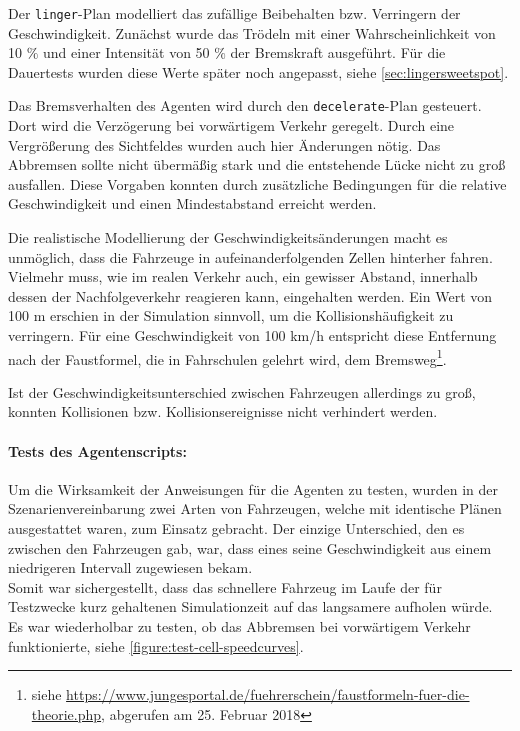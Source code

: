 Der \texttt{linger}-Plan modelliert das zufällige Beibehalten bzw. Verringern der Geschwindigkeit. 
Zunächst wurde das Trödeln mit einer Wahrscheinlichkeit von 10 $\%$ und einer Intensität von 50 $\%$ der Bremskraft ausgeführt.
Für die Dauertests wurden diese Werte später noch angepasst, siehe \cref{sec:lingersweetspot}.

Das Bremsverhalten des Agenten wird durch den \texttt{decelerate}-Plan gesteuert. 
Dort wird die Verzögerung bei vorwärtigem Verkehr geregelt.
Durch eine Vergrößerung des Sichtfeldes wurden auch hier Änderungen nötig. 
Das Abbremsen sollte nicht übermäßig stark und die entstehende Lücke nicht zu groß ausfallen. 
Diese Vorgaben konnten durch zusätzliche Bedingungen für die relative Geschwindigkeit und einen Mindestabstand erreicht werden.

Die realistische Modellierung der Geschwindigkeitsänderungen macht es unmöglich, dass die Fahrzeuge in aufeinanderfolgenden Zellen hinterher fahren.
Vielmehr muss, wie im realen Verkehr auch, ein gewisser Abstand, innerhalb dessen der Nachfolgeverkehr reagieren kann, eingehalten werden.
Ein Wert von 100 m erschien in der Simulation sinnvoll, um die Kollisionshäufigkeit zu verringern. 
Für eine Geschwindigkeit von 100 km/h entspricht diese Entfernung nach der Faustformel, die in Fahrschulen gelehrt wird, dem Bremsweg\footnote{siehe \url{https://www.jungesportal.de/fuehrerschein/faustformeln-fuer-die-theorie.php}, abgerufen am 25. Februar 2018}.

Ist der Geschwindigkeitsunterschied zwischen Fahrzeugen allerdings zu groß, konnten Kollisionen bzw. Kollisionsereignisse nicht verhindert werden.

\paragraph*{Tests des Agentenscripts:}
Um die Wirksamkeit der Anweisungen für die Agenten zu testen, wurden in der Szenarienvereinbarung zwei Arten von Fahrzeugen, welche mit identische Plänen ausgestattet waren, zum Einsatz gebracht.
Der einzige Unterschied, den es zwischen den Fahrzeugen gab, war, dass eines seine Geschwindigkeit aus einem niedrigeren Intervall zugewiesen bekam.
\\
Somit war sichergestellt, dass das schnellere Fahrzeug im Laufe der für Testzwecke kurz gehaltenen Simulationzeit auf das langsamere aufholen würde.
Es war wiederholbar zu testen, ob das Abbremsen bei vorwärtigem Verkehr funktionierte, siehe \cref{figure:test-cell-speedcurves}.

